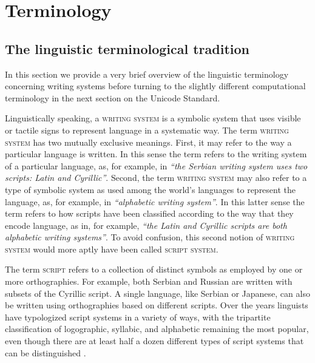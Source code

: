 \chapter{Terminology} \label{terminology}

\section{The linguistic terminological tradition}
\label{the-linguistic-tradition}

In this section we provide a very brief overview of the linguistic terminology
concerning writing systems before turning to the slightly different
computational terminology in the next section on the Unicode Standard.

Linguistically speaking, a \textsc{writing system} is a symbolic system that
uses visible or tactile signs to represent language in a systematic way. The
term \textsc{writing system} has two mutually exclusive meanings. First, it may
refer to the way a particular language is written. In this sense the term refers
to the writing system of a particular language, as, for example, in \emph{``the
Serbian writing system uses two scripts: Latin and Cyrillic''}. Second, the term
\textsc{writing system} may also refer to a type of symbolic system as used
among the world's languages to represent the language, as, for example, in
\emph{``alphabetic writing system''}. In this latter sense the term refers to
how scripts have been classified according to the way that they encode language,
as in, for example, \emph{``the Latin and Cyrillic scripts are both alphabetic
writing systems''}. To avoid confusion, this second notion of \textsc{writing
system} would more aptly have been called \textsc{script system}.

The term \textsc{script} refers to a collection of distinct symbols as employed
by one or more orthographies. For example, both Serbian and Russian are written
with subsets of the Cyrillic script. A single language, like Serbian or
Japanese, can also be written using orthographies based on different scripts.
Over the years linguists have typologized script systems in a variety of ways,
with the tripartite classification of logographic, syllabic, and alphabetic
remaining the most popular, even though there are at least half a dozen
different types of script systems that can be distinguished
\citep{Daniels1990,Daniels1996}.

